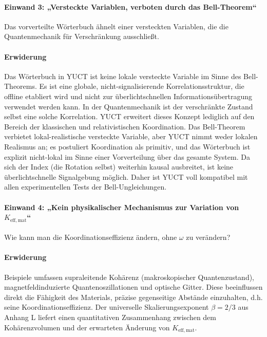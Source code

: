 \documentclass[12pt,a4paper]{article}
\newcommand{\betaf}{\beta}
\begin{document}
	\paragraph{Einwand 3: „Versteckte Variablen, verboten durch das Bell-Theorem“}
	Das vorverteilte Wörterbuch ähnelt einer versteckten Variablen, die die Quantenmechanik für Verschränkung ausschließt.
	
	\paragraph{Erwiderung}
	Das Wörterbuch in YUCT ist keine lokale versteckte Variable im Sinne des Bell-Theorems. Es ist eine globale, nicht-signalisierende Korrelationsstruktur, die offline etabliert wird und nicht zur überlichtschnellen Informationsübertragung verwendet werden kann. In der Quantenmechanik ist der verschränkte Zustand selbst eine solche Korrelation. YUCT erweitert dieses Konzept lediglich auf den Bereich der klassischen und relativistischen Koordination. Das Bell-Theorem verbietet lokal-realistische versteckte Variable, aber YUCT nimmt weder lokalen Realismus an; es postuliert Koordination als primitiv, und das Wörterbuch ist explizit nicht-lokal im Sinne einer Vorverteilung über das gesamte System. Da sich der Index (die Rotation selbst) weiterhin kausal ausbreitet, ist keine überlichtschnelle Signalgebung möglich. Daher ist YUCT voll kompatibel mit allen experimentellen Tests der Bell-Ungleichungen.
	
	\paragraph{Einwand 4: „Kein physikalischer Mechanismus zur Variation von \(K_{\mathrm{eff,mat}}\)“}
	Wie kann man die Koordinationseffizienz ändern, ohne \(\omega\) zu verändern?
	
	\paragraph{Erwiderung}
	Beispiele umfassen supraleitende Kohärenz (makroskopischer Quantenzustand), magnetfeldinduzierte Quantenoszillationen und optische Gitter. Diese beeinflussen direkt die Fähigkeit des Materials, präzise gegenseitige Abstände einzuhalten, d.h. seine Koordinationseffizienz. Der universelle Skalierungsexponent \(\betaf = 2/3\) aus Anhang L liefert einen quantitativen Zusammenhang zwischen dem Kohärenzvolumen und der erwarteten Änderung von \(K_{\mathrm{eff,mat}}\).
	
\end{document}
